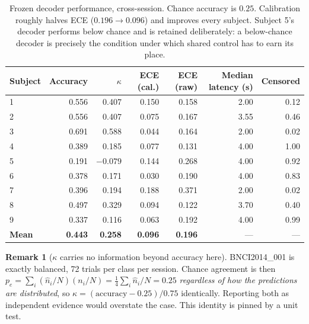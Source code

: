 \documentclass[11pt,a4paper]{article}
\theoremstyle{plain}
\theoremstyle{definition}
\newtheorem{remark}{Remark}
\begin{document}
\begin{table}[htbp]
\centering
\small
\begin{tabular}{@{}lrrrrrr@{}}
\toprule
Subject & Accuracy & $\kappa$ & ECE (cal.) & ECE (raw) & Median latency (s) & Censored \\
\midrule
1 & 0.556 & 0.407 & 0.150 & 0.158 & 2.00 & 0.12 \\
2 & 0.556 & 0.407 & 0.075 & 0.167 & 3.55 & 0.46 \\
3 & 0.691 & 0.588 & 0.044 & 0.164 & 2.00 & 0.02 \\
4 & 0.389 & 0.185 & 0.077 & 0.131 & 4.00 & 1.00 \\
5 & 0.191 & $-0.079$ & 0.144 & 0.268 & 4.00 & 0.92 \\
6 & 0.378 & 0.171 & 0.030 & 0.190 & 4.00 & 0.83 \\
7 & 0.396 & 0.194 & 0.188 & 0.371 & 2.00 & 0.02 \\
8 & 0.497 & 0.329 & 0.094 & 0.122 & 3.70 & 0.40 \\
9 & 0.337 & 0.116 & 0.063 & 0.192 & 4.00 & 0.99 \\
\midrule
\textbf{Mean} & \textbf{0.443} & \textbf{0.258} & \textbf{0.096} & \textbf{0.196} & --- & --- \\
\bottomrule
\end{tabular}
\caption{Frozen decoder performance, cross-session. Chance accuracy is
$0.25$. Calibration roughly halves ECE ($0.196 \rightarrow 0.096$) and
improves every subject. Subject 5's decoder performs below chance and
is retained deliberately: a below-chance decoder is precisely the
condition under which shared control has to earn its place.}
\label{tab:decoder}
\end{table}

\begin{remark}[$\kappa$ carries no information beyond accuracy here]
BNCI2014\_001 is exactly balanced, 72 trials per class per session.
Chance agreement is then
$p_e = \sum_i (\hat n_i/N)(n_i/N) = \tfrac14 \sum_i \hat n_i/N = 0.25$
\emph{regardless of how the predictions are distributed}, so
$\kappa = (\text{accuracy} - 0.25)/0.75$ identically. Reporting both as
independent evidence would overstate the case. This identity is pinned
by a unit test.
\end{remark}
\end{document}
